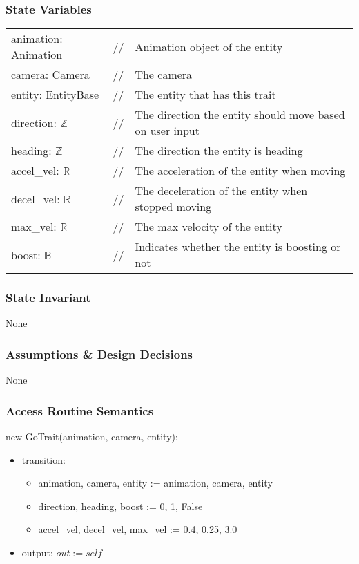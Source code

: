 \documentclass[12pt]{article}
\begin{document}
\subsubsection* {State Variables}
\begin{tabular}{lll}
    animation: Animation & // & Animation object of the entity\\
    camera: Camera & // & The camera\\
    entity: EntityBase & // & The entity that has this trait\\
    direction: $\mathbb{Z}$ & // & The direction the entity should move based on user input \\
    heading: $\mathbb{Z}$ & // & The direction the entity is heading\\
    accel\_vel: $\mathbb{R}$ & // & The acceleration of the entity when moving\\
    decel\_vel: $\mathbb{R}$ & // & The deceleration of the entity when stopped moving \\
    max\_vel: $\mathbb{R}$ & // & The max velocity of the entity\\
    boost: $\mathbb{B}$ & // & Indicates whether the entity is boosting or not\\
\end{tabular}

\subsubsection* {State Invariant}

None

\subsubsection* {Assumptions \& Design Decisions}

None

\subsubsection* {Access Routine Semantics}

new GoTrait(animation, camera, entity):
\begin{itemize}
    \item transition: 
    \begin{itemize}[]
        \item animation, camera, entity := animation, camera, entity
        \item direction, heading, boost := 0, 1, False
        \item accel\_vel, decel\_vel, max\_vel := 0.4, 0.25, 3.0
    \end{itemize}
    \item output: $out := self$
\end{itemize}
\end{document}
